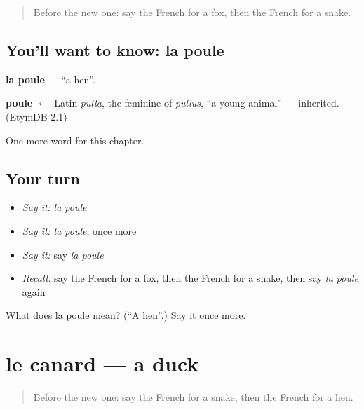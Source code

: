 \label{lesson:FR-C86-poule}



\begin{quote}
Before the new one: say the French for a fox, then the French for a snake.
\end{quote}

\subsection*{You'll want to know: la poule}
\textbf{la poule} — \textquotedblleft{}a hen\textquotedblright{}.

\begin{cousinweb}
\textbf{poule} $\leftarrow$ Latin \emph{pulla}, the feminine of \emph{pullus}, \textquotedblleft{}a young animal\textquotedblright{} — inherited. (EtymDB 2.1)
\end{cousinweb}

\begin{grammarlens}[title={What you've built}]
One more word for this chapter.
\end{grammarlens}

\subsection*{Your turn}
\begin{itemize}
\raggedright
  \item \emph{Say it:} \emph{la poule}
  \item \emph{Say it:} \emph{la poule}, once more
  \item \emph{Say it:} say \emph{la poule}
  \item \emph{Recall:} say the French for a fox, then the French for a snake, then say \emph{la poule} again
\end{itemize}

\begin{tcolorbox}[breakable,colback=teal!4,colframe=teal!35!black,title={Before you move on}]
What does la poule mean? (\textquotedblleft{}A hen\textquotedblright{}.) Say it once more.
\end{tcolorbox}
\section[le canard]{le canard — a duck}

\label{lesson:FR-C86-canard}



\begin{quote}
Before the new one: say the French for a snake, then the French for a hen.
\end{quote}

